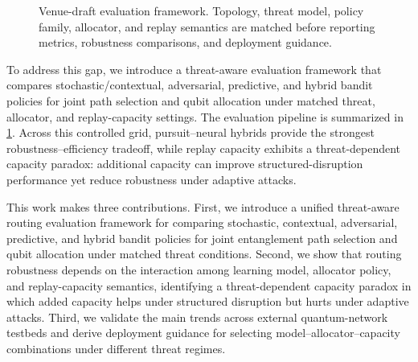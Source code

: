 \documentclass[10pt,conference]{IEEEtran}
\begin{document}
\begin{figure}[t]
\centering
\footnotesize
{}
\caption{Venue-draft evaluation framework. Topology, threat model, policy family, allocator, and replay semantics are matched before reporting metrics, robustness comparisons, and deployment guidance.}
\label{fig:framework}
\end{figure}

To address this gap, we introduce a threat-aware evaluation framework that compares stochastic/contextual, adversarial, predictive, and hybrid bandit policies for joint path selection and qubit allocation under matched threat, allocator, and replay-capacity settings. The evaluation pipeline is summarized in \cref{fig:framework}. Across this controlled grid, pursuit--neural hybrids provide the strongest robustness--efficiency tradeoff, while replay capacity exhibits a threat-dependent capacity paradox: additional capacity can improve structured-disruption performance yet reduce robustness under adaptive attacks.

This work makes three contributions. First, we introduce a unified threat-aware routing evaluation framework for comparing stochastic, contextual, adversarial, predictive, and hybrid bandit policies for joint entanglement path selection and qubit allocation under matched threat conditions. Second, we show that routing robustness depends on the interaction among learning model, allocator policy, and replay-capacity semantics, identifying a threat-dependent capacity paradox in which added capacity helps under structured disruption but hurts under adaptive attacks. Third, we validate the main trends across external quantum-network testbeds and derive deployment guidance for selecting model--allocator--capacity combinations under different threat regimes.
\end{document}

